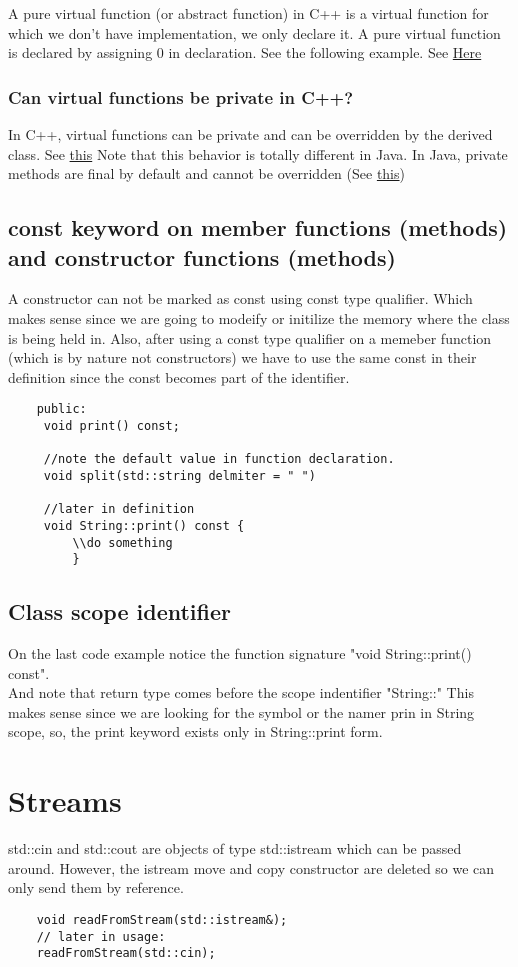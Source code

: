 \documentclass[11pt,twoside,a4paper]{report}
\begin{document}
A pure virtual function (or abstract function) in C++ is a virtual function for which we don’t have implementation, we only declare it. A pure virtual function is declared by assigning 0 in declaration. See the following example.
See \href{https://www.geeksforgeeks.org/pure-virtual-functions-and-abstract-classes/}{Here}

\subsection{Can virtual functions be private in C++?}
In C++, virtual functions can be private and can be overridden by the derived class. See \href{https://www.geeksforgeeks.org/can-virtual-functions-be-private-in-c/}{this}
Note that this behavior is totally different in Java. In Java, private methods are final by default and cannot be overridden (See \href{https://www.geeksforgeeks.org/can-override-private-methods-java/}{this})

\section{const keyword on member functions (methods) and constructor functions (methods)}
A constructor can not be marked as const using const type qualifier. Which makes sense since we are going to modeify or initilize the memory where the class is being held in.
Also, after using a const type qualifier on a memeber function (which is by nature not constructors) we have to use the same const in their definition since the const becomes part of the
identifier.

\begin{lstlisting}
    public:
     void print() const;

     //note the default value in function declaration.
     void split(std::string delmiter = " ")

     //later in definition
     void String::print() const {
         \\do something
         }
\end{lstlisting}

\section{Class scope identifier}
On the last code example notice the function signature "void String::print() const".\\
And note that return type comes before the scope indentifier "String::" This makes sense since we are looking for the symbol or the namer prin in String scope,
so, the print keyword exists only in String::print form.

\chapter{Streams}
std::cin and std::cout are objects of type std::istream which can be passed around. However, the istream move and copy constructor are deleted so we can only send them by reference.

\begin{lstlisting}
    void readFromStream(std::istream&);
    // later in usage:
    readFromStream(std::cin);
\end{lstlisting}
\end{document}
